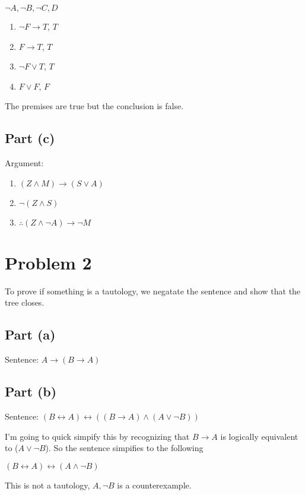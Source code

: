 \documentclass[12pt]{article}
\begin{document}
$\lnot A, \lnot B, \lnot C, D$

\begin{enumerate}
    \item $\lnot F \rightarrow T$, $T$ 
    \item $F \rightarrow T$, $T$
    \item $\lnot F \lor T$, $T$
    \item $F \lor F$, $F$
\end{enumerate}

The premises are true but the conclusion is false.

\subsection*{Part (c)}

Argument:
\begin{enumerate}
    \item $(Z \land M) \rightarrow (S \lor A)$
    \item $\lnot (Z \land S)$
    \item $\therefore (Z \land \lnot A) \rightarrow \lnot M$
\end{enumerate}

\section*{Problem 2}

To prove if something is a tautology, we negatate the sentence and show that the tree closes. 

\subsection*{Part (a)}

Sentence: $A \rightarrow (B \rightarrow A)$


\subsection*{Part (b)}

Sentence: $(B \leftrightarrow A) \leftrightarrow ((B \rightarrow A) \land (A \lor \lnot B))$

I'm going to quick simpify this by recognizing that $B \rightarrow A$ is logically equivalent to ($A \lor \lnot B$). So the sentence simpifies to the following

$(B \leftrightarrow A) \leftrightarrow (A \land \lnot B)$


This is not a tautology, $A, \lnot B$ is a counterexample.
\end{document}
